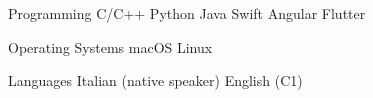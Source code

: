 

\begin{cvskills}

  \cvskill
    {Programming} %
    {C/C++ {\enskip\cdotp\enskip} Python {\enskip\cdotp\enskip} Java {\enskip\cdotp\enskip} Swift {\enskip\cdotp\enskip} Angular {\enskip\cdotp\enskip} Flutter} %
    
  \cvskill
    {Operating Systems} %
    {macOS {\enskip\cdotp\enskip} Linux} %

  \cvskill
    {Languages} %
    {Italian (native speaker) {\enskip\cdotp\enskip} English (C1)} %

\end{cvskills}
